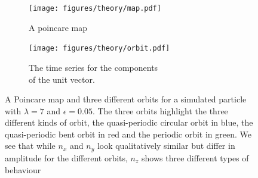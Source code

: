 

\begin{figure}[H]
\centering
\begin{subfigure}[b]{0.45\textwidth}
\texttt{[image: figures/theory/map.pdf]}
\caption{A poincare map}\label{fig:orbitmap}
\end{subfigure}\hspace{1em}%
\begin{subfigure}[b]{0.5\textwidth}
\texttt{[image: figures/theory/orbit.pdf]}
\caption{The time series for the components \\ of the unit vector.}\label{fig:orbitparams}
\end{subfigure}
\caption{A Poincare map and three different orbits for a simulated particle with $\lambda=7$ and $\epsilon=0.05$. The three orbits highlight the three different kinds of orbit, the quasi-periodic circular orbit in blue, the quasi-periodic bent orbit in red and the periodic orbit in green. We see that while $n_x$ and $n_y$ look qualitatively similar but differ in amplitude for the different orbits, $n_z$ shows three different types of behaviour}
\label{fig:orbittypes}
\end{figure}



